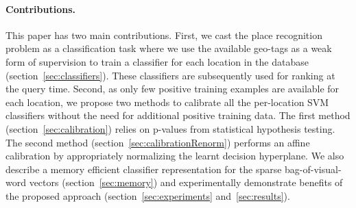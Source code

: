 \paragraph{Contributions.} 
  This paper has two main contributions. \textcolor{petr}{First, we cast the place recognition problem as a classification task where we use the available geo-tags as a weak form of supervision to train a classifier for each location in the database (section~\ref{sec:classifiers})}. 
  \textcolor{petr}{
    These classifiers are subsequently used for ranking at the query time.
  } 
  Second, as only few positive training examples are available for each location, we propose two methods to calibrate all the per-location SVM classifiers without the need for additional positive training data. The first method (section~\ref{sec:calibration}) relies on p-values from statistical hypothesis testing. The second method (section~\ref{sec:calibrationRenorm}) performs an affine calibration by appropriately normalizing the learnt decision hyperplane. 
  We also describe a memory efficient classifier representation for the sparse bag-of-visual-word vectors (section~\ref{sec:memory}) and  experimentally demonstrate benefits of the proposed approach (section~\ref{sec:experiments} and~\ref{sec:results}). 


